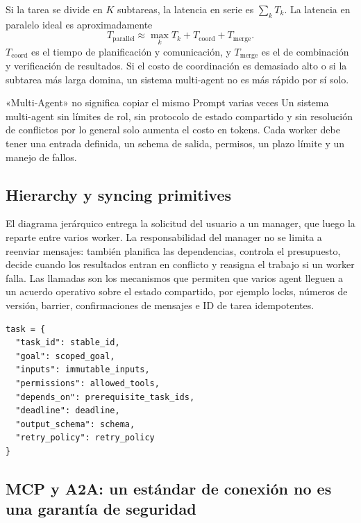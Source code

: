 Si la tarea se divide en $K$ subtareas, la latencia en serie es $\sum_k T_k$. La latencia en paralelo ideal es aproximadamente
\[
T_{\text{parallel}}\approx \max_k T_k+T_{\text{coord}}+T_{\text{merge}}.
\]
$T_{\text{coord}}$ es el tiempo de planificación y comunicación, y $T_{\text{merge}}$ es el de combinación y verificación de resultados. Si el costo de coordinación es demasiado alto o si la subtarea más larga domina, un sistema multi-agent no es más rápido por sí solo.

\begin{warningbox}{«Multi-Agent» no significa copiar el mismo Prompt varias veces}
Un sistema multi-agent sin límites de rol, sin protocolo de estado compartido y sin resolución de conflictos por lo general solo aumenta el costo en tokens. Cada worker debe tener una entrada definida, un schema de salida, permisos, un plazo límite y un manejo de fallos.
\end{warningbox}

\subsection{Hierarchy y syncing primitives}

El diagrama jerárquico entrega la solicitud del usuario a un manager, que luego la reparte entre varios worker. La responsabilidad del manager no se limita a reenviar mensajes: también planifica las dependencias, controla el presupuesto, decide cuando los resultados entran en conflicto y reasigna el trabajo si un worker falla. Las llamadas  son los mecanismos que permiten que varios agent lleguen a un acuerdo operativo sobre el estado compartido, por ejemplo locks, números de versión, barrier, confirmaciones de mensajes e ID de tarea idempotentes.


\begin{lstlisting}[caption={Contrato de tarea manager--worker}]
task = {
  "task_id": stable_id,
  "goal": scoped_goal,
  "inputs": immutable_inputs,
  "permissions": allowed_tools,
  "depends_on": prerequisite_task_ids,
  "deadline": deadline,
  "output_schema": schema,
  "retry_policy": retry_policy
}
\end{lstlisting}

\subsection{MCP y A2A: un estándar de conexión no es una garantía de seguridad}

